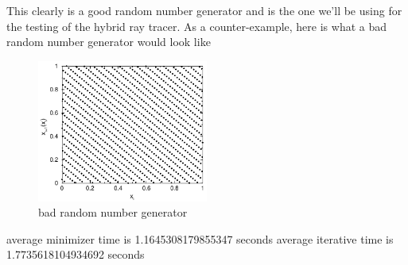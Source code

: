 \documentclass{article}
\begin{document}
This clearly is a good random number generator and is the one we'll be using for the testing of the hybrid ray tracer. 
As a counter-example, here is what a bad random number generator would look like
\begin{figure}
	\centering
	\includegraphics[width=0.5\textwidth]{figures/BadRandom.png}
	\caption{bad random number generator}
\end{figure}
average minimizer time is 1.1645308179855347 seconds
average iterative time is 1.7735618104934692 seconds
\end{document}
